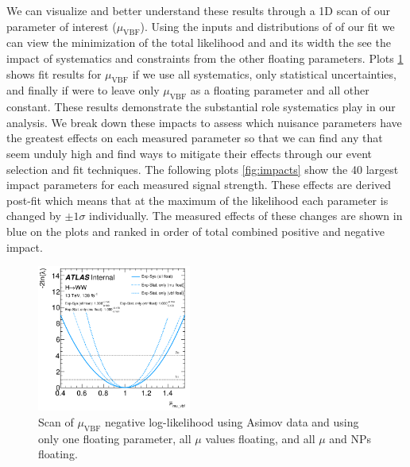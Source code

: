 We can visualize and better understand these results through a 1D scan of our parameter of interest ($\mu_{\text{VBF}}$). Using the inputs and distributions of of our fit we can view the minimization of the total likelihood and and its width the see the impact of systematics and constraints from the other floating parameters. Plots \ref{fig:scan} shows fit results for $\mu_{\text{VBF}}$ if we use all systematics, only statistical uncertainties, and finally if were to leave only $\mu_{\text{VBF}}$ as a floating parameter and all other constant. These results demonstrate the substantial role systematics play in our analysis. We break down these impacts to assess which nuisance parameters have the greatest effects on each measured parameter so that we can find any that seem unduly high and find ways to mitigate their effects through our event selection and fit techniques. The following plots \ref{fig:impacts} show the 40 largest impact parameters for each measured signal strength. These effects are derived post-fit which means that at the maximum of the likelihood each parameter is changed by $\pm 1\sigma$ individually. The measured effects of these changes are shown in blue on the plots and ranked in order of total combined positive and negative impact. 

\begin{figure}[!h]
\centering
\includegraphics[width=0.45\textwidth]{Pictures/fitresults/afterfit.png}
\caption{Scan of $\mu_{\text{VBF}}$ negative log-likelihood using Asimov data and using only one floating parameter, all $\mu$ values floating, and all $\mu$ and NPs floating.}
\label{fig:scan}
\end{figure}

